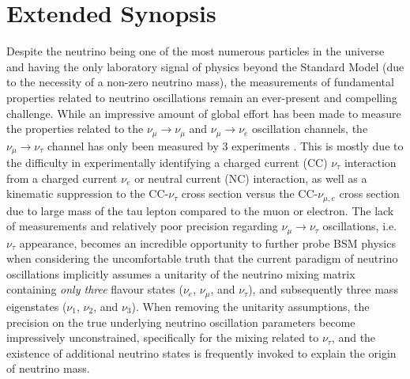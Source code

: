 \documentclass[a4paper,11pt]{article}
\begin{document}
\newpage



\section{Extended Synopsis}

Despite the neutrino being one of the most numerous particles in the universe and having the only laboratory signal of physics beyond the Standard Model (due to the necessity of a non-zero neutrino mass), the measurements of fundamental properties related to neutrino oscillations remain an ever-present and compelling challenge. While an impressive amount of global effort \cite{Tanabashi:2018oca,
Esteban:2018azc} has been made to measure the properties related to the $\nu_\mu\rightarrow \nu_\mu$ and $\nu_\mu \rightarrow \nu_e$ oscillation channels, the $\nu_\mu \rightarrow \nu_\tau$ channel has only been measured by 3 experiments \cite{Li:2017dbe, Agafonova:2018auq, Aartsen:2019tjl}. This is mostly due to the difficulty in experimentally identifying a charged current (CC) $\nu_\tau$ interaction from a charged current $\nu_e$ or neutral current (NC) interaction, as well as a kinematic suppression to the CC-$\nu_\tau$ cross section versus the CC-$\nu_{\mu,e}$ cross section due to large mass of the tau lepton compared to the muon or electron. The lack of measurements and relatively poor precision regarding $\nu_\mu \rightarrow \nu_\tau$ oscillations, i.e.\@ $\nu_\tau$ appearance, becomes an incredible opportunity to further probe BSM physics when considering the uncomfortable truth that the current paradigm of neutrino oscillations implicitly assumes a unitarity of the neutrino mixing matrix containing  \emph{only three} flavour states ($\nu_e$, $\nu_\mu$, and $\nu_\tau$), and subsequently three mass eigenstates ($\nu_1$, $\nu_2$, and $\nu_3$). When removing the unitarity assumptions, the precision on the true underlying neutrino oscillation parameters become impressively unconstrained, specifically for the mixing related to $\nu_\tau$\cite{Parke:2015goa}, and the existence of additional neutrino states is frequently invoked to explain the origin of neutrino mass.
\end{document}
